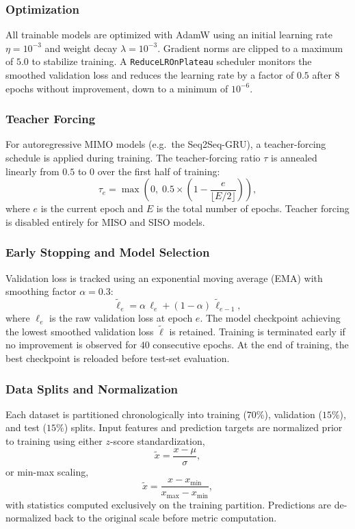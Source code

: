 \documentclass[12pt]{article}
\begin{document}
\subsubsection{Optimization}

All trainable models are optimized with AdamW using an initial learning rate $\eta = 10^{-3}$ and weight decay $\lambda = 10^{-3}$. Gradient norms are clipped to a maximum of $5.0$ to stabilize training. A \texttt{ReduceLROnPlateau} scheduler monitors the smoothed validation loss and reduces the learning rate by a factor of $0.5$ after $8$ epochs without improvement, down to a minimum of $10^{-6}$.

\subsubsection{Teacher Forcing}

For autoregressive MIMO models (e.g.\ the Seq2Seq-GRU), a teacher-forcing schedule is applied during training. The teacher-forcing ratio $\tau$ is annealed linearly from $0.5$ to $0$ over the first half of training:
\[
    \tau_e = \max\!\left(0,\; 0.5 \times \left(1 - \frac{e}{\lfloor E/2 \rfloor}\right)\right),
\]
where $e$ is the current epoch and $E$ is the total number of epochs. Teacher forcing is disabled entirely for MISO and SISO models.

\subsubsection{Early Stopping and Model Selection}

Validation loss is tracked using an exponential moving average (EMA) with smoothing factor $\alpha = 0.3$:
\[
    \tilde{\ell}_e = \alpha\,\ell_e + (1 - \alpha)\,\tilde{\ell}_{e-1},
\]
where $\ell_e$ is the raw validation loss at epoch $e$. The model checkpoint achieving the lowest smoothed validation loss $\tilde{\ell}$ is retained. Training is terminated early if no improvement is observed for $40$ consecutive epochs. At the end of training, the best checkpoint is reloaded before test-set evaluation.

\subsubsection{Data Splits and Normalization}

Each dataset is partitioned chronologically into training ($70\%$), validation ($15\%$), and test ($15\%$) splits. Input features and prediction targets are normalized prior to training using either $z$-score standardization,
\[
    \tilde{x} = \frac{x - \mu}{\sigma},
\]
or min-max scaling,
\[
    \tilde{x} = \frac{x - x_{\min}}{x_{\max} - x_{\min}},
\]
with statistics computed exclusively on the training partition. Predictions are de-normalized back to the original scale before metric computation.
\end{document}
